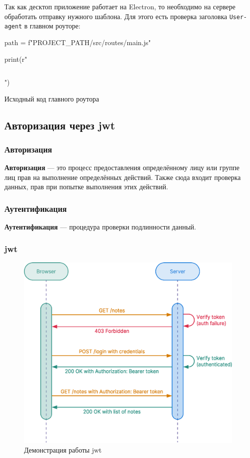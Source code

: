 Так как десктоп приложение работает на Electron, то необходимо на сервере обработать отправку нужного шаблона. Для этого есть проверка заголовка \texttt{User-agent} в главном роуторе:

\begin{listing}[H]
\begin{pycode}
path = f"{PROJECT_PATH}/src/routes/main.js"

print(r"\inputminted{csharp}{" + path + r"}")
\end{pycode}
\caption{Исходный код главного роутора}
\end{listing}

\subsection{Авторизация через \acrfull{jwt}}

\subsubsection{Авторизация}
\textbf{Авторизация} --- это процесс предоставления определённому лицу или группе лиц прав на выполнение определённых действий. Также сюда входит проверка данных, прав при попытке выполнения этих действий.

\subsubsection{Аутентификация}
\textbf{Аутентификация} --- процедура проверки подлинности данный.

\subsubsection{\acrfull{jwt}}
\begin{figure}[h!]
    \begin{center}
        \includegraphics[scale=0.4]{images/jwt-example.eps}
        \caption{Демонстрация работы \acrshort{jwt}}
    \end{center}
\end{figure}

